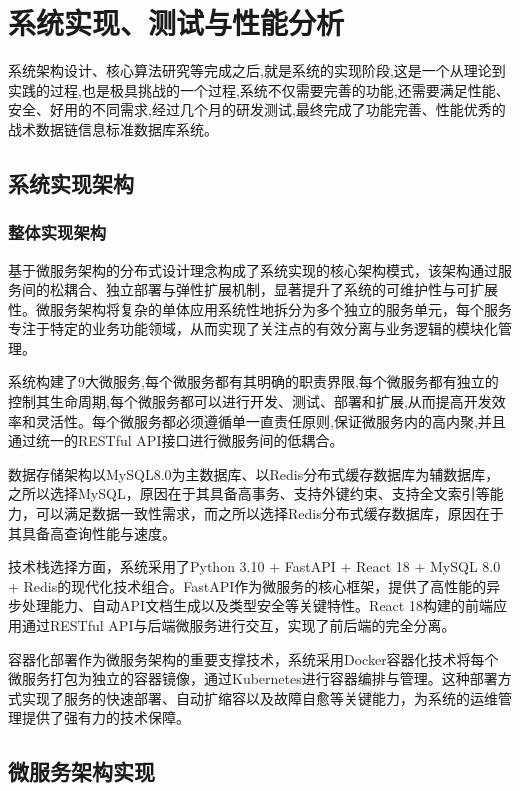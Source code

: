 \chapter{系统实现、测试与性能分析}

系统架构设计、核心算法研究等完成之后,就是系统的实现阶段,这是一个从理论到实践的过程,也是极具挑战的一个过程,系统不仅需要完善的功能,还需要满足性能、安全、好用的不同需求,经过几个月的研发测试,最终完成了功能完善、性能优秀的战术数据链信息标准数据库系统。

\section{系统实现架构}

\subsection{整体实现架构}

基于微服务架构的分布式设计理念构成了系统实现的核心架构模式，该架构通过服务间的松耦合、独立部署与弹性扩展机制，显著提升了系统的可维护性与可扩展性。微服务架构将复杂的单体应用系统性地拆分为多个独立的服务单元，每个服务专注于特定的业务功能领域，从而实现了关注点的有效分离与业务逻辑的模块化管理。

系统构建了9大微服务,每个微服务都有其明确的职责界限,每个微服务都有独立的控制其生命周期,每个微服务都可以进行开发、测试、部署和扩展,从而提高开发效率和灵活性。每个微服务都必须遵循单一直责任原则,保证微服务内的高内聚,并且通过统一的RESTful API接口进行微服务间的低耦合。

数据存储架构以MySQL8.0为主数据库、以Redis分布式缓存数据库为辅数据库，之所以选择MySQL，原因在于其具备高事务、支持外键约束、支持全文索引等能力，可以满足数据一致性需求，而之所以选择Redis分布式缓存数据库，原因在于其具备高查询性能与速度。

技术栈选择方面，系统采用了Python 3.10 + FastAPI + React 18 + MySQL 8.0 + Redis的现代化技术组合。FastAPI作为微服务的核心框架，提供了高性能的异步处理能力、自动API文档生成以及类型安全等关键特性。React 18构建的前端应用通过RESTful API与后端微服务进行交互，实现了前后端的完全分离。

容器化部署作为微服务架构的重要支撑技术，系统采用Docker容器化技术将每个微服务打包为独立的容器镜像，通过Kubernetes进行容器编排与管理。这种部署方式实现了服务的快速部署、自动扩缩容以及故障自愈等关键能力，为系统的运维管理提供了强有力的技术保障。

\section{微服务架构实现}

